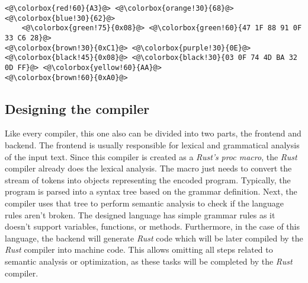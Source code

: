 \begin{minipage}{\linewidth}
\begin{lstlisting}[caption={Example test case.},label={tc}]
<@\colorbox{red!60}{A3}@> <@\colorbox{orange!30}{68}@> <@\colorbox{blue!30}{62}@> 
    <@\colorbox{green!75}{0x08}@> <@\colorbox{green!60}{47 1F 88 91 0F 33 C6 28}@> 
<@\colorbox{brown!30}{0xC1}@> <@\colorbox{purple!30}{0E}@> <@\colorbox{black!45}{0x08}@> <@\colorbox{black!30}{03 0F 74 4D BA 32 0D FF}@> <@\colorbox{yellow!60}{AA}@> 
<@\colorbox{brown!60}{0xA0}@>
\end{lstlisting}
\end{minipage}

\subsection{Designing the compiler} \label{sec:compiler}
Like every compiler, this one also can be divided into two parts, the frontend and backend. The frontend is usually responsible for lexical and grammatical analysis of the input text. Since this compiler is created as a \textit{Rust's} \textit{proc macro}, the \textit{Rust} compiler already does the lexical analysis. The macro just needs to convert the stream of tokens into objects representing the encoded program. Typically, the program is parsed into a syntax tree based on the grammar definition. Next, the compiler uses that tree to perform semantic analysis to check if the language rules aren't broken. The designed language has simple grammar rules as it doesn't support variables, functions, or methods. Furthermore, in the case of this language, the backend will generate \textit{Rust} code which will be later compiled by the \textit{Rust} compiler into machine code. This allows omitting all steps related to semantic analysis or optimization, as these tasks will be completed by the \textit{Rust} compiler. 

